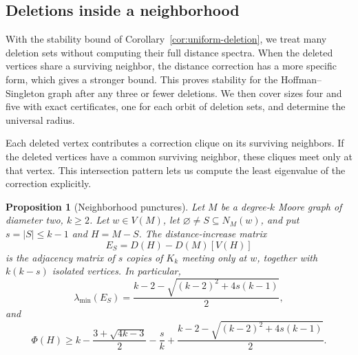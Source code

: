\documentclass[a4paper,10pt,reqno]{amsart}
\theoremstyle{plain}
\newtheorem{proposition}[theorem]{Proposition}
\theoremstyle{definition}
\theoremstyle{remark}
\begin{document}
\subsection{Deletions inside a neighborhood}

With the stability bound of Corollary~\ref{cor:uniform-deletion}, we treat
many deletion sets without computing their full distance spectra. When the
deleted vertices share a surviving neighbor, the distance correction has a
more specific form, which gives a stronger bound. This proves stability for
the Hoffman--Singleton graph after any three or fewer deletions. We then
cover sizes four and five with exact certificates, one for each orbit of
deletion sets, and determine the universal radius.

Each deleted vertex contributes a correction clique on its surviving
neighbors. If the deleted vertices have a common surviving neighbor,
these cliques meet only at that vertex. This intersection pattern lets us
compute the least eigenvalue of the correction explicitly.

\begin{proposition}[Neighborhood punctures]
\label{prop:neighborhood-puncture}
Let \(M\) be a degree-\(k\) Moore graph of diameter two, \(k\ge2\).
Let \(w\in V(M)\), let \(\varnothing\ne S\subseteq N_M(w)\), and put
\(s=|S|\le k-1\) and \(H=M-S\).  The distance-increase matrix
\[
 E_S=D(H)-D(M)[V(H)]
\]
is the adjacency matrix of \(s\) copies of \(K_k\) meeting only at \(w\),
together with \(k(k-s)\) isolated vertices.  In particular,
\[
 \lambda_{\min}(E_S)
 =\frac{k-2-\sqrt{(k-2)^2+4s(k-1)}}2,
\]
and
\[
 \Phi(H)\ge
 k-\frac{3+\sqrt{4k-3}}2-\frac{s}{k}
 +\frac{k-2-\sqrt{(k-2)^2+4s(k-1)}}2.
\]
\end{proposition}
\end{document}
